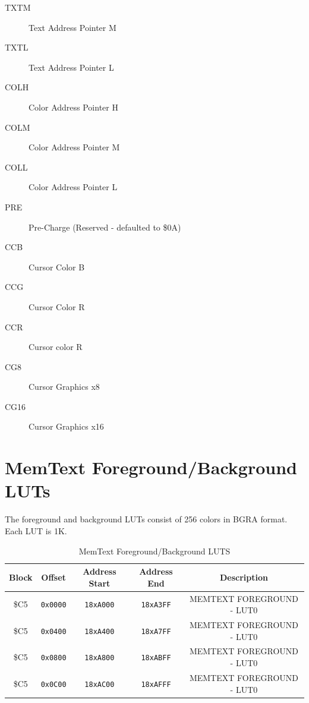 \begin{description}
    \item[TXTM] Text Address Pointer M

    \item[TXTL] Text Address Pointer L

    \item[COLH] Color Address Pointer H

    \item[COLM] Color Address Pointer M

    \item[COLL] Color Address Pointer L

    \item[PRE] Pre-Charge (Reserved - defaulted to \$0A)

    \item[CCB] Cursor Color B

    \item[CCG] Cursor Color R

    \item[CCR] Cursor color R

    \item[CG8] Cursor Graphics x8

    \item[CG16] Cursor Graphics x16    
\end{description}

\section*{MemText Foreground/Background LUTs}

The foreground and background LUTs consist of 256 colors in BGRA format.  Each LUT is 1K.

\begin{table}[ht]
    \begin{center}
        \begin{tabular}{|c|c|c|c|c|} \hline
          Block & Offset & Address Start & Address End & Description \\\hline\hline
          \$C5 & \verb+0x0000+ & \verb+18xA000+ & \verb+18xA3FF+ & MEMTEXT FOREGROUND - LUT0 \\ \hline
          \$C5 & \verb+0x0400+ & \verb+18xA400+ & \verb+18xA7FF+ & MEMTEXT FOREGROUND - LUT0 \\ \hline
          \$C5 & \verb+0x0800+ & \verb+18xA800+ & \verb+18xABFF+ & MEMTEXT FOREGROUND - LUT0 \\ \hline
          \$C5 & \verb+0x0C00+ & \verb+18xAC00+ & \verb+18xAFFF+ & MEMTEXT FOREGROUND - LUT0 \\ \hline
       \end{tabular}
    \end{center}
    \caption{MemText Foreground/Background LUTS}
    \label{tab:memtext_fgbglut}
\end{table}

